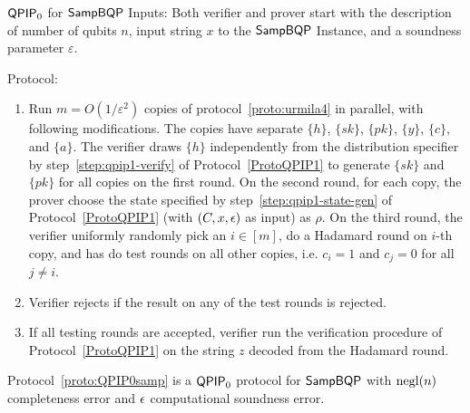 \begin{protocol}{$\operatorname{\mathsf{QPIP}}_0$ for $\operatorname{\mathsf{SampBQP}}$}
\label{proto:QPIP0samp}
Inputs: 
 Both verifier and prover start with the description of number of qubits $n$,  input string $x$ to the $\operatorname{\mathsf{SampBQP}}$ Instance, and a soundness parameter $\varepsilon$.
    
Protocol:
\begin{enumerate}
    
    \item Run $m=O(1/\varepsilon^2)$ copies of protocol~\ref{proto:urmila4} in parallel, with following modifications. The copies have separate $\{h\}$, $\{sk\}$, $\{pk\}$, $\{y\}$, $\{c\}$, and $\{a\}$.  The verifier draws $\{h\}$ independently from the distribution specifier by step~\ref{step:qpip1-verify} of Protocol~\ref{ProtoQPIP1} to generate $\{sk\}$ and $\{pk\}$ for all copies on the first round. On the second round, for each copy, the prover choose the state specified by step~\ref{step:qpip1-state-gen} of Protocol~\ref{ProtoQPIP1}  (with  $(C,x,\epsilon)$ as input) as $\rho$. On the third round, the verifier uniformly randomly pick an $i\in [m]$, do a Hadamard round on $i$-th copy, and has do test rounds on all other copies, i.e. $c_i=1$ and $c_j=0$ for all $j\neq i$.
    \item \label{step:multi-testing}Verifier rejects if the result on any of the test rounds is rejected. 
    \item If all testing rounds are accepted, verifier run the verification procedure of Protocol~\ref{ProtoQPIP1} on the string $z$ decoded from the Hadamard round.
\end{enumerate}
\end{protocol}

\begin{theorem}\label{thm:qpip0}
    Protocol~\ref{proto:QPIP0samp} is a $\operatorname{\mathsf{QPIP}}_0$ protocol for $\operatorname{\mathsf{SampBQP}}$ with $\operatorname{negl}(n)$ completeness error and $\epsilon$ computational soundness error. 
\end{theorem}





